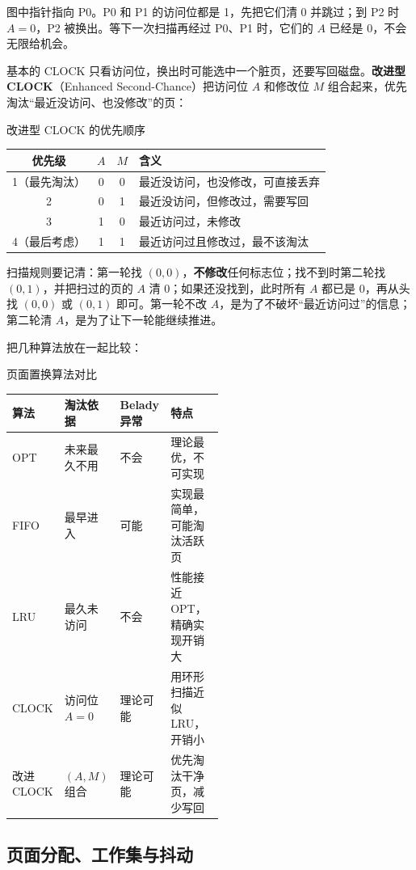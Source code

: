 图中指针指向 P0。P0 和 P1 的访问位都是 1，先把它们清 0 并跳过；到 P2 时 $A=0$，P2 被换出。等下一次扫描再经过 P0、P1 时，它们的 $A$ 已经是 0，不会无限给机会。

基本的 CLOCK 只看访问位，换出时可能选中一个脏页，还要写回磁盘。\textbf{改进型 CLOCK}（Enhanced Second-Chance）把访问位 $A$ 和修改位 $M$ 组合起来，优先淘汰“最近没访问、也没修改”的页：

\begin{tablebox}{改进型 CLOCK 的优先顺序}
\centering
\begin{tabular}{|c|c|c|l|}
\hline
优先级 & $A$ & $M$ & 含义 \\
\hline
1（最先淘汰） & 0 & 0 & 最近没访问，也没修改，可直接丢弃 \\
\hline
2 & 0 & 1 & 最近没访问，但修改过，需要写回 \\
\hline
3 & 1 & 0 & 最近访问过，未修改 \\
\hline
4（最后考虑） & 1 & 1 & 最近访问过且修改过，最不该淘汰 \\
\hline
\end{tabular}
\end{tablebox}

扫描规则要记清：第一轮找 $(0,0)$，\textbf{不修改}任何标志位；找不到时第二轮找 $(0,1)$，并把扫过的页的 $A$ 清 0；如果还没找到，此时所有 $A$ 都已是 0，再从头找 $(0,0)$ 或 $(0,1)$ 即可。第一轮不改 $A$，是为了不破坏“最近访问过”的信息；第二轮清 $A$，是为了让下一轮能继续推进。

把几种算法放在一起比较：

\begin{tablebox}{页面置换算法对比}
\centering
\begin{tabularx}{\linewidth}{|p{0.14\linewidth}|p{0.22\linewidth}|p{0.16\linewidth}|X|}
\hline
算法 & 淘汰依据 & Belady 异常 & 特点 \\
\hline
OPT & 未来最久不用 & 不会 & 理论最优，不可实现 \\
\hline
FIFO & 最早进入 & 可能 & 实现最简单，可能淘汰活跃页 \\
\hline
LRU & 最久未访问 & 不会 & 性能接近 OPT，精确实现开销大 \\
\hline
CLOCK & 访问位 $A=0$ & 理论可能 & 用环形扫描近似 LRU，开销小 \\
\hline
改进 CLOCK & $(A,M)$ 组合 & 理论可能 & 优先淘汰干净页，减少写回 \\
\hline
\end{tabularx}
\end{tablebox}

\subsection{页面分配、工作集与抖动}


